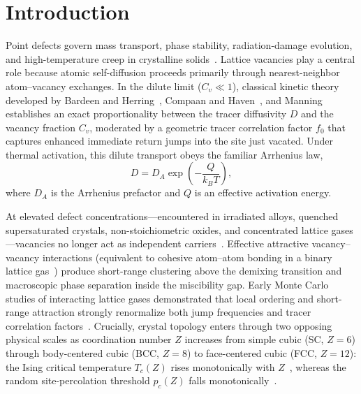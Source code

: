 \documentclass[aps,pre,reprint,superscriptaddress,amsmath,amssymb,floatfix]{revtex4-2}
\begin{document}
\maketitle

\section{Introduction}
\label{sec:intro}

Point defects govern mass transport, phase stability, radiation-damage evolution, and high-temperature creep in crystalline solids~\cite{Flynn1972,Manning1968,Allnatt1993}. Lattice vacancies play a central role because atomic self-diffusion proceeds primarily through nearest-neighbor atom--vacancy exchanges. In the dilute limit ($C_v \ll 1$), classical kinetic theory developed by Bardeen and Herring~\cite{Bardeen1952}, Compaan and Haven~\cite{Compaan1956}, and Manning~\cite{Manning1968} establishes an exact proportionality between the tracer diffusivity $D$ and the vacancy fraction $C_v$, moderated by a geometric tracer correlation factor $f_0$ that captures enhanced immediate return jumps into the site just vacated. Under thermal activation, this dilute transport obeys the familiar Arrhenius law,
\begin{equation}
  D = D_A \exp\!\left(-\frac{Q}{k_B T}\right),
  \label{eq:arrhenius}
\end{equation}
where $D_A$ is the Arrhenius prefactor and $Q$ is an effective activation energy.

At elevated defect concentrations---encountered in irradiated alloys, quenched supersaturated crystals, non-stoichiometric oxides, and concentrated lattice gases---vacancies no longer act as independent carriers~\cite{Murch1977,Kehr1984,Kehr1989,Allnatt1993}. Effective attractive vacancy--vacancy interactions (equivalent to cohesive atom--atom bonding in a binary lattice gas~\cite{Lee1952,Yeomans1992}) produce short-range clustering above the demixing transition and macroscopic phase separation inside the miscibility gap. Early Monte Carlo studies of interacting lattice gases demonstrated that local ordering and short-range attraction strongly renormalize both jump frequencies and tracer correlation factors~\cite{Murch1977,Kehr1984,Kehr1989}. Crucially, crystal topology enters through two opposing physical scales as coordination number $Z$ increases from simple cubic (SC, $Z=6$) through body-centered cubic (BCC, $Z=8$) to face-centered cubic (FCC, $Z=12$): the Ising critical temperature $T_c(Z)$ rises monotonically with $Z$~\cite{Ferrenberg2018,Lundow2009}, whereas the random site-percolation threshold $p_c(Z)$ falls monotonically~\cite{Stauffer1994,Lorenz1998,Wang2013}.
\end{document}
